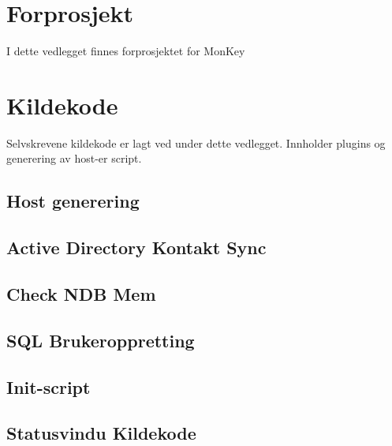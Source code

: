 \documentclass[a4paper,twoside,11pt,pdftex,norsk]{report}
\newcounter{includepdfpage}
\newcounter{currentpagecounter}
\newcommand{\addlabelstoallincludedpages}[1]{
   \refstepcounter{includepdfpage}
   \stepcounter{currentpagecounter}
	\appendix
   \label{#1.\thecurrentpagecounter}}
\newcommand{\modifiedincludepdf}[3]{
    \setcounter{currentpagecounter}{0}
    }
\newenvironment{changemargin}[2]{%
\begin{list}{}{%
\linespread{0.9}%
\setlength{\topsep}{0pt}%
\setlength{\leftmargin}{#1}%
\setlength{\rightmargin}{#2}%
\setlength{\listparindent}{\parindent}%
\setlength{\itemindent}{\parindent}%
\setlength{\parsep}{\parskip}%
}%
\item[]}{\end{list}}
\begin{document}
\begin{appendices}
\chapter{Forprosjekt}\label{app:forprosjekt}
I dette vedlegget finnes forprosjektet for MonKey


\chapter{Kildekode}\label{app:kildekode}
Selvskrevene kildekode er lagt ved under dette vedlegget. Innholder plugins og generering av host-er script.

\begin{changemargin}{-1cm}{-1cm}
\section{Host generering}


\section{Active Directory Kontakt Sync}


\section{Check NDB Mem}

\clearpage
\section{SQL Brukeroppretting}


\section{Init-script}


\section{Statusvindu Kildekode}









\clearpage

\clearpage

\end{changemargin}
\end{appendices}
\end{document}

